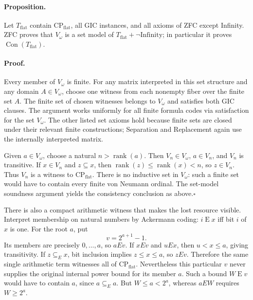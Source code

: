 \paragraph{Proposition.}
Let $T_{\mathrm{flat}}$ contain $\mathrm{CP}_{\mathrm{flat}}$, all GIC
instances, and all axioms of ZFC except Infinity.  ZFC proves that
$V_\omega$ is a set model of $T_{\mathrm{flat}}+\neg\mathrm{Infinity}$;
in particular it proves $\operatorname{Con}(T_{\mathrm{flat}})$.

\paragraph{Proof.}
Every member of $V_\omega$ is finite.  For any matrix interpreted in this
set structure and any domain $A\in V_\omega$, choose one witness from
each nonempty fiber over the finite set $A$.  The finite set of chosen
witnesses belongs to $V_\omega$ and satisfies both GIC clauses.  The
argument works uniformly for all finite formula codes via satisfaction
for the set $V_\omega$.  The other listed set axioms hold because finite
sets are closed under their relevant finite constructions; Separation
and Replacement again use the internally interpreted matrix.

Given $a\in V_\omega$, choose a natural $n>\operatorname{rank}(a)$.
Then $V_n\in V_\omega$, $a\in V_n$, and $V_n$ is transitive.
If $x\in V_n$ and $z\subseteq x$, then
$\operatorname{rank}(z)\leq\operatorname{rank}(x)<n$, so $z\in V_n$.
Thus $V_n$ is a witness to $\mathrm{CP}_{\mathrm{flat}}$.
There is no inductive set in $V_\omega$: such a finite set would have
to contain every finite von Neumann ordinal.  The set-model soundness
argument yields the consistency conclusion as above.\hfill$\square$

There is also a compact arithmetic witness that makes the lost resource
visible.  Interpret membership on natural numbers by Ackermann coding:
$i\mathrel{E}x$ iff bit $i$ of $x$ is one.  For the root $a$, put
\[
 v=2^{a+1}-1.
\]
Its members are precisely $0,\ldots,a$, so $aEv$.  If $xEv$ and $uEx$,
then $u<x\leq a$, giving transitivity.  If $z\subseteq_E x$, bit
inclusion implies $z\leq x\leq a$, so $zEv$.  Therefore the same single
arithmetic term witnesses all of $\mathrm{CP}_{\mathrm{flat}}$.
Nevertheless this particular $v$ never supplies the original internal
power bound for its member $a$.  Such a bound $W\mathrel{E}v$ would
have to contain $a$, since $a\subseteq_E a$.  But $W\leq a<2^a$,
whereas $aEW$ requires $W\geq 2^a$.

